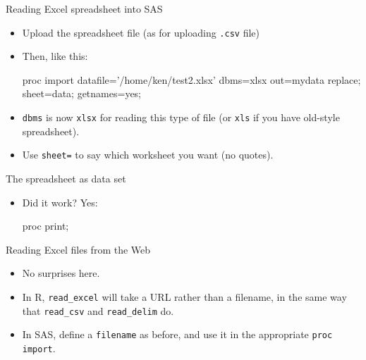 \documentclass[unknownkeysallowed]{beamer}\usepackage[]{graphicx}\usepackage[]{color}
\begin{document}
\begin{frame}[fragile]{Reading Excel spreadsheet into SAS}
  
  \begin{itemize}
  \item Upload the spreadsheet file (as for uploading \texttt{.csv}
    file)
  \item Then, like this:
    
    \begin{Datastep}
proc import 
  datafile='/home/ken/test2.xlsx'
  dbms=xlsx
  out=mydata
  replace;
  sheet=data;
  getnames=yes;
    \end{Datastep}
    
    
  \item \texttt{dbms} is now \texttt{xlsx} for reading this type of
    file (or \texttt{xls} if you have old-style spreadsheet).
  \item Use \texttt{sheet=} to say which worksheet you want (no quotes).
    
  \end{itemize}
  
\end{frame}

\begin{frame}[fragile]{The spreadsheet as data set}

  
  \begin{itemize}
  \item Did it work? Yes:

    \begin{Sascode}[store=re]
proc print;    
  \end{Sascode}
  


  \end{itemize}
  
  
\end{frame}

\begin{frame}[fragile]{Reading Excel files from the Web}
  
  \begin{itemize}
  \item No surprises here.
  \item In R, \texttt{read\_excel} will take a URL rather than a filename,
    in the same way that \texttt{read\_csv} and \texttt{read\_delim}
    do.
  \item In SAS, define a \texttt{filename} as before, and use it in
    the appropriate \texttt{proc import}.
  \end{itemize}
  
\end{frame}
\end{document}

